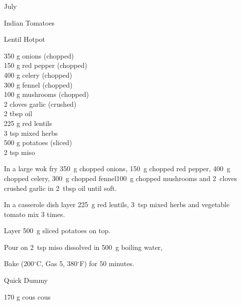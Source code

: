\begin{menu}{July}
\begin{recipe}{2}{Indian Tomatoes}
\begin{instructions}
    \end{instructions}
    \end{recipe}%
  
    \begin{recipe}{2}{Lentil Hotpot}%
		\begin{ingredients}
		350 g onions (chopped) \\
	150 g red pepper (chopped) \\
	400 g celery (chopped) \\
	300 g fennel (chopped) \\
	100 g mushrooms (chopped) \\
	2 cloves garlic (crushed) \\
	2 tbsp oil  \\
	225 g red lentils  \\
	3 tsp mixed herbs  \\
	500 g potatoes (sliced) \\
	2 tsp miso  \\
	
		\end{ingredients}
	
	
    \begin{instructions}
    \item 
        In a large wok fry
        350~g chopped onions,
        150~g chopped red pepper,
        400~g chopped celery,
        300~g chopped fennel100~g chopped mushrooms
        and
        2~cloves crushed garlic
        in
        2~tbsp  oil
        until soft.
      \item 
        In a casserole dish layer
        225~g  red lentils,
        3~tsp  mixed herbs
        and vegetable tomato mix 3 times.
      \item 
        Layer 500~g sliced potatoes on top.
      \item 
        Pour on
        2~tsp  miso
        dissolved in
        500~g  boiling water,
      \item 
        Bake (200$^{\circ}$C, Gas 5, 380$^{\circ}$F) for 50 minutes.
      
    \end{instructions}
    \end{recipe}%
  
    \begin{recipe}{1}{Quick Dummy}%
		\begin{ingredients}
		170 g cous cous  \\
	

\end{ingredients}
\end{recipe}
\end{menu}
